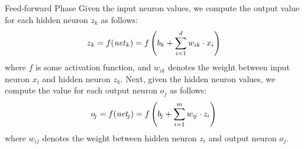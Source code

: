 \begin{frame}{Feed-forward Phase}
%
%
Given the input neuron values,  
we compute the output value for each hidden neuron $z_k$
as follows:
\begin{align*}
    z_k = f(\mathit{net}_k) = f\left(b_k + \sum_{i=1}^d w_{ik} \cdot x_i\right)
\end{align*}
where $f$ is some activation function, and $w_{ik}$ denotes the weight
between input neuron $x_i$ and hidden neuron $z_k$.
Next, given the hidden
neuron values, we compute the value for each output
neuron $o_{\!j}$ as follows:
\begin{align*}
    o_{\!j} = f(\mathit{net}_{\!j}) = f\left(b_{\!j} + \sum_{i=1}^m w_{i\!j}
    \cdot z_i\right)
\end{align*}
where $w_{ij}$ denotes the weight between hidden neuron $z_i$ and output
neuron $o_{\!j}$.
\end{frame}
%
